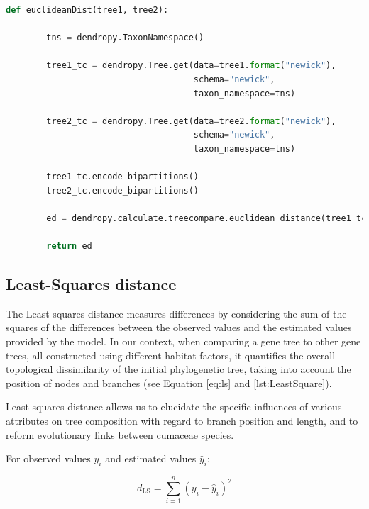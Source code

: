 \begin{lstlisting}[label=lst:euclideanDist,language=Python,caption=Python script for calculating the Euclidean distance using the ete3 package in the aPhyloGeo package]
    def euclideanDist(tree1, tree2):
        
        tns = dendropy.TaxonNamespace()
        
        tree1_tc = dendropy.Tree.get(data=tree1.format("newick"), 
                                     schema="newick", 
                                     taxon_namespace=tns)
                                     
        tree2_tc = dendropy.Tree.get(data=tree2.format("newick"), 
                                     schema="newick", 
                                     taxon_namespace=tns)
                                     
        tree1_tc.encode_bipartitions()
        tree2_tc.encode_bipartitions()

        ed = dendropy.calculate.treecompare.euclidean_distance(tree1_tc, tree2_tc)

        return ed
\end{lstlisting}

\subsection{Least-Squares distance}\label{LS}

The Least squares distance measures differences by considering the sum of the squares of the differences between the observed values and the estimated values provided by the model. In our context, when comparing a gene tree to other gene trees, all constructed using different habitat factors, it quantifies the overall topological dissimilarity of the initial phylogenetic tree, taking into account the position of nodes and branches (see Equation \eqref{eq:ls} and \autoref{lst:LeastSquare}).

Least-squares distance allows us to elucidate the specific influences of various attributes on tree composition with regard to branch position and length, and to reform evolutionary links between cumaceae species.

For observed values $y_i$ and estimated values $\hat{y}_i$:

\begin{equation}\label{eq:ls}
    d_{\text{LS}} = \sum_{i=1}^{n} (y_i - \hat{y}_i)^2
\end{equation}

